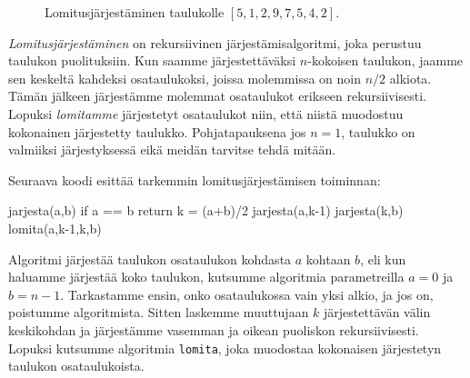 \begin{figure}
\caption{Lomitusjärjestäminen taulukolle $[5,1,2,9,7,5,4,2]$.}
\label{fig:lomjar}
\end{figure}

\emph{Lomitusjärjestäminen} on rekursiivinen järjestämisalgoritmi,
joka perustuu taulukon puolituksiin.
Kun saamme järjestettäväksi $n$-kokoisen taulukon,
jaamme sen keskeltä kahdeksi osataulukoksi,
joissa molemmissa on noin $n/2$ alkiota.
Tämän jälkeen järjestämme molemmat osataulukot erikseen rekursiivisesti.
Lopuksi \emph{lomitamme} järjestetyt osataulukot niin,
että niistä muodostuu kokonainen järjestetty taulukko.
Pohjatapauksena jos $n=1$,
taulukko on valmiiksi järjestyksessä eikä
meidän tarvitse tehdä mitään.

Seuraava koodi esittää tarkemmin lomitusjärjestämisen toiminnan:

\begin{code}
jarjesta(a,b)
    if a == b
        return
    k = (a+b)/2
    jarjesta(a,k-1)
    jarjesta(k,b)
    lomita(a,k-1,k,b)
\end{code}

Algoritmi järjestää taulukon osataulukon kohdasta
$a$ kohtaan $b$, eli kun haluamme järjestää koko taulukon,
kutsumme algoritmia parametreilla $a=0$ ja $b=n-1$.
Tarkastamme ensin, onko osataulukossa vain yksi alkio,
ja jos on, poistumme algoritmista.
Sitten laskemme muuttujaan $k$ järjestettävän välin keskikohdan
ja järjestämme vasemman ja oikean puoliskon rekursiivisesti.
Lopuksi kutsumme algoritmia \texttt{lomita},
joka muodostaa kokonaisen järjestetyn taulukon osataulukoista.


